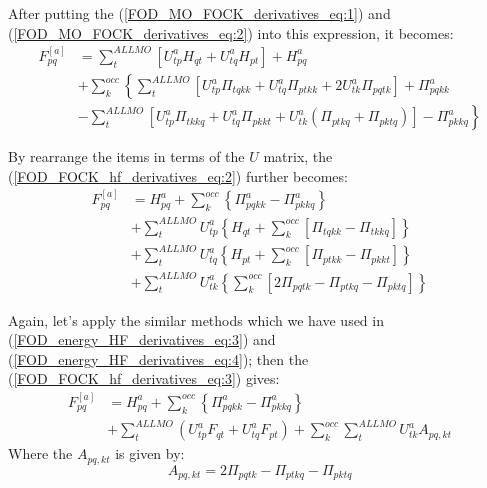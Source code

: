 After putting the (\ref{FOD_MO_FOCK_derivatives_eq:1}) and
(\ref{FOD_MO_FOCK_derivatives_eq:2}) into this expression, it becomes: 
\begin{align}
  \label{FOD_FOCK_hf_derivatives_eq:2}
F_{pq}^{[a]} &= \sum_{t}^{ALL MO}\left[U^{a}_{tp}H_{qt} +
  U^{a}_{tq}H_{pt}\right] + H^{a}_{pq} \nonumber \\  
  &+ 
\sum_{k}^{occ}\left \{ \sum_{t}^{ALL MO}\left[ 
U^{a}_{tp}\Pi_{tqkk} +
U^{a}_{tq}\Pi_{ptkk} + 
2U^{a}_{tk}\Pi_{pqtk}   
\right] + \Pi^{a}_{pqkk} \right. \nonumber \\
  &\left. -
\sum_{t}^{ALL MO}\left[ 
U^{a}_{tp}\Pi_{tkkq} +
U^{a}_{tq}\Pi_{pkkt} + 
U^{a}_{tk}\left(\Pi_{ptkq} + \Pi_{pktq}\right)   
\right] - \Pi^{a}_{pkkq}
  \right \} 
\end{align}

By rearrange the items in terms of the $U$ matrix, the
(\ref{FOD_FOCK_hf_derivatives_eq:2}) further becomes:
\begin{align}
  \label{FOD_FOCK_hf_derivatives_eq:3}
F_{pq}^{[a]} &= H^{a}_{pq} + 
\sum_{k}^{occ}\left \{\Pi^{a}_{pqkk} - \Pi^{a}_{pkkq} \right\}
\nonumber \\
&+  \sum_{t}^{ALL MO}U^{a}_{tp}\left\{H_{qt} + 
  \sum_{k}^{occ}\left[\Pi_{tqkk} -
   \Pi_{tkkq} \right]\right \}\nonumber \\
&+  \sum_{t}^{ALL MO}U^{a}_{tq}\left\{H_{pt} + 
  \sum_{k}^{occ}\left[\Pi_{ptkk} -
   \Pi_{pkkt} \right]\right \}\nonumber \\
&+ \sum_{t}^{ALL MO}U^{a}_{tk}\left\{ 
\sum_{k}^{occ}\left[ 
2\Pi_{pqtk} - \Pi_{ptkq} - \Pi_{pktq}\right]
\right\}
\end{align}

Again, let's apply the similar methods which we have used in
(\ref{FOD_energy_HF_derivatives_eq:3}) and
(\ref{FOD_energy_HF_derivatives_eq:4}); then the
(\ref{FOD_FOCK_hf_derivatives_eq:3}) gives:
\begin{align}
  \label{FOD_FOCK_hf_derivatives_eq:4}
F_{pq}^{[a]} &= H^{a}_{pq} + 
\sum_{k}^{occ}\left \{\Pi^{a}_{pqkk} - \Pi^{a}_{pkkq} \right\}
\nonumber \\
&+  \sum_{t}^{ALL MO}\left(U^{a}_{tp}F_{qt} + U^{a}_{tq}F_{pt}\right)
+ \sum_{k}^{occ}\sum_{t}^{ALL MO}U^{a}_{tk}A_{pq,kt} 
\end{align}
Where the $A_{pq,kt}$ is given by:
\begin{equation}
    \label{FOD_FOCK_hf_derivatives_eq:5}
A_{pq,kt}  = 2\Pi_{pqtk} - \Pi_{ptkq} - \Pi_{pktq}
\end{equation}

